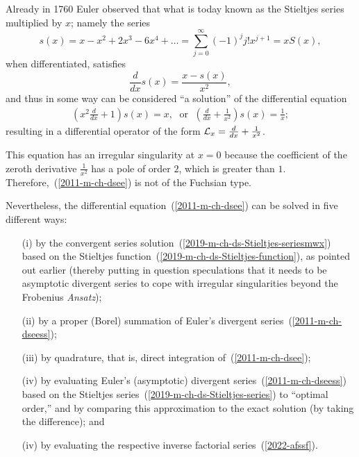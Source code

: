 Already in 1760 Euler observed\cite[-7mm]{Euler60} that what is today known as
the Stieltjes series
multiplied by  $x$; namely
the series
\begin{equation}
s(x) = x - x^2+2x^3-6x^4 + \ldots  = \sum_{j=0}^\infty (-1)^j j!  x^{j+1}   = x S(x)
,
\label{2011-m-ch-dseess}
\end{equation}
when differentiated, satisfies
\begin{equation}
\frac{d}{dx}s(x)= \frac{x-s(x)}{x^2},
\end{equation}
and thus in some way can be considered ``a solution'' of the  differential equation
\begin{equation}
\begin{split}
\left(x^2 \frac{d}{dx} +1\right) s(x) = {x},\;\text{ or }\;
\left(\frac{d}{dx} +\frac{1}{x^2}\right) s(x) = \frac{1}{x};
\end{split}
\label{2011-m-ch-dsee}
\end{equation}
resulting in a differential operator of the form ${\cal L}_x = \frac{d}{dx} +\frac{1}{x^2}$.

This equation has an irregular singularity at $x=0$ because
the coefficient of the zeroth derivative  $\frac{1}{x^2}$ has a pole of order $2$, which is greater than $1$.
Therefore,~(\ref{2011-m-ch-dsee}) is not of the Fuchsian type.

Nevertheless, the differential equation~(\ref{2011-m-ch-dsee})
can be solved in five different ways:
\begin{itemize}
\item[(i)] by the convergent series solution~(\ref{2019-m-ch-ds-Stieltjes-seriesmwx})
based on the Stieltjes function~(\ref{2019-m-ch-ds-Stieltjes-function}), as pointed out earlier
(thereby putting in question speculations that it needs to be asymptotic divergent series to cope with irregular singularities
beyond the Frobenius {\it Ansatz});
\item[(ii)] by a proper (Borel) summation of Euler's divergent series~(\ref{2011-m-ch-dseess});
\item[(iii)] by quadrature, that is, direct integration of~(\ref{2011-m-ch-dsee});
\item[(iv)] by evaluating Euler's (asymptotic) divergent series~(\ref{2011-m-ch-dseess})
based on the Stieltjes series~(\ref{2019-m-ch-ds-Stieltjes-series})
to ``optimal order,''
and by comparing this approximation to the exact solution (by taking the difference); and
\item[(iv)] by evaluating the respective inverse factorial series~(\ref{2022-afssf}).
\end{itemize}



